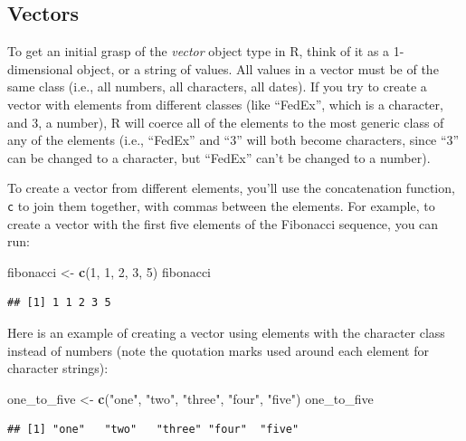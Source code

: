 \documentclass[]{book}
\makeatletter
\newenvironment{Shaded}{\begin{snugshade}}{\end{snugshade}}
\newcommand{\KeywordTok}[1]{\textcolor[rgb]{0.13,0.29,0.53}{\textbf{#1}}}
\newcommand{\DecValTok}[1]{\textcolor[rgb]{0.00,0.00,0.81}{#1}}
\newcommand{\StringTok}[1]{\textcolor[rgb]{0.31,0.60,0.02}{#1}}
\newcommand{\NormalTok}[1]{#1}
\newenvironment{kframe}{%
\medskip{}
\setlength{\fboxsep}{.8em}
 \def\at@end@of@kframe{}%
 \ifinner\ifhmode%
  \def\at@end@of@kframe{\end{minipage}}%
  \begin{minipage}{\columnwidth}%
 \fi\fi%
 \def\FrameCommand##1{\hskip\@totalleftmargin \hskip-\fboxsep
 \colorbox{shadecolor}{##1}\hskip-\fboxsep
     \hskip-\linewidth \hskip-\@totalleftmargin \hskip\columnwidth}%
 \MakeFramed {\advance\hsize-\width
   \@totalleftmargin\z@ \linewidth\hsize
   \@setminipage}}%
 {\par\unskip\endMakeFramed%
 \at@end@of@kframe}
\renewenvironment{Shaded}{\begin{kframe}}{\end{kframe}}
\theoremstyle{definition}
\theoremstyle{definition}
\theoremstyle{definition}
\theoremstyle{remark}
\makeatother
\begin{document}
\subsection{Vectors}\label{vectors}

To get an initial grasp of the \emph{vector} object type in R, think of
it as a 1-dimensional object, or a string of values. All values in a
vector must be of the same class (i.e., all numbers, all characters, all
dates). If you try to create a vector with elements from different
classes (like ``FedEx'', which is a character, and 3, a number), R will
coerce all of the elements to the most generic class of any of the
elements (i.e., ``FedEx'' and ``3'' will both become characters, since
``3'' can be changed to a character, but ``FedEx'' can't be changed to a
number).

To create a vector from different elements, you'll use the concatenation
function, \texttt{c} to join them together, with commas between the
elements. For example, to create a vector with the first five elements
of the Fibonacci sequence, you can run:

\begin{Shaded}
\begin{Highlighting}[]
\NormalTok{fibonacci <-}\StringTok{ }\KeywordTok{c}\NormalTok{(}\DecValTok{1}\NormalTok{, }\DecValTok{1}\NormalTok{, }\DecValTok{2}\NormalTok{, }\DecValTok{3}\NormalTok{, }\DecValTok{5}\NormalTok{)}
\NormalTok{fibonacci}
\end{Highlighting}
\end{Shaded}

\begin{verbatim}
## [1] 1 1 2 3 5
\end{verbatim}

Here is an example of creating a vector using elements with the
character class instead of numbers (note the quotation marks used around
each element for character strings):

\begin{Shaded}
\begin{Highlighting}[]
\NormalTok{one_to_five <-}\StringTok{ }\KeywordTok{c}\NormalTok{(}\StringTok{"one"}\NormalTok{, }\StringTok{"two"}\NormalTok{, }\StringTok{"three"}\NormalTok{, }\StringTok{"four"}\NormalTok{, }\StringTok{"five"}\NormalTok{)}
\NormalTok{one_to_five}
\end{Highlighting}
\end{Shaded}

\begin{verbatim}
## [1] "one"   "two"   "three" "four"  "five"
\end{verbatim}
\end{document}
